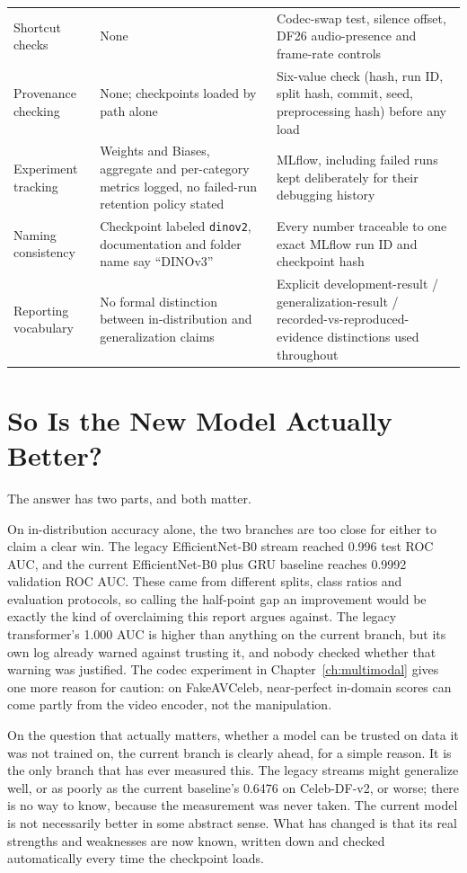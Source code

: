 \begin{table}[ht]
\begin{tabular}{p{3.6cm}p{5.4cm}p{5.4cm}}
        Shortcut checks & None & Codec-swap test, silence offset, DF26 audio-presence and frame-rate controls \\
        Provenance checking & None; checkpoints loaded by path alone & Six-value check (hash, run ID, split hash, commit, seed, preprocessing hash) before any load \\
        Experiment tracking & Weights and Biases, aggregate and per-category metrics logged, no failed-run retention policy stated & MLflow, including failed runs kept deliberately for their debugging history \\
        Naming consistency & Checkpoint labeled \texttt{dinov2}, documentation and folder name say ``DINOv3'' & Every number traceable to one exact MLflow run ID and checkpoint hash \\
        Reporting vocabulary & No formal distinction between in-distribution and generalization claims & Explicit development-result / generalization-result / recorded-vs-reproduced-evidence distinctions used throughout \\
        \bottomrule
    \end{tabular}
\end{table}

\section{So Is the New Model Actually Better?}

The answer has two parts, and both matter.

On in-distribution accuracy alone, the two branches are too close for either to
claim a clear win. The legacy EfficientNet-B0 stream reached 0.996 test ROC
AUC, and the current EfficientNet-B0 plus GRU baseline reaches 0.9992
validation ROC AUC. These came from different splits, class ratios and
evaluation protocols, so calling the half-point gap an improvement would be
exactly the kind of overclaiming this report argues against. The legacy
transformer's 1.000 AUC is higher than anything on the current branch, but its
own log already warned against trusting it, and nobody checked whether that
warning was justified. The codec experiment in Chapter~\ref{ch:multimodal}
gives one more reason for caution: on FakeAVCeleb, near-perfect in-domain scores
can come partly from the video encoder, not the manipulation.

On the question that actually matters, whether a model can be trusted on data
it was not trained on, the current branch is clearly ahead, for a simple
reason. It is the only branch that has ever measured this. The legacy streams
might generalize well, or as poorly as the current baseline's 0.6476 on
Celeb-DF-v2, or worse; there is no way to know, because the measurement was
never taken. The current model is not necessarily better in some abstract
sense. What has changed is that its real strengths and weaknesses are now
known, written down and checked automatically every time the checkpoint loads.

